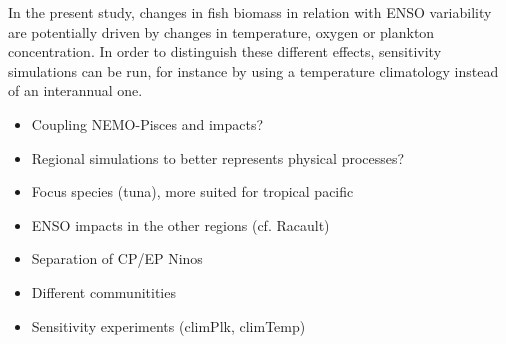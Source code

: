 In the present study, changes in fish biomass in relation with ENSO variability are potentially driven by changes in temperature, oxygen or plankton concentration. In order to distinguish these different effects, sensitivity simulations can be run, for instance by using a temperature climatology instead of an interannual one. 

\begin{itemize}
    \item Coupling NEMO-Pisces and impacts?  %
    \item Regional simulations to better represents physical processes? %
    \item Focus species (tuna), more suited for tropical pacific
    \item ENSO impacts in the other regions (cf. Racault)  
    \item Separation of CP/EP Ninos  %
    \item Different communitities
    \item Sensitivity experiments (climPlk, climTemp)
    \end{itemize}




